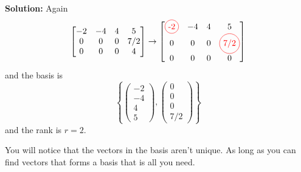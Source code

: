 \documentclass[reqno]{amsart}
\theoremstyle{definition}
\begin{document}
\begin{enumerate}
\textbf{Solution:  }
Again
%
\begin{equation*}
\begin{bmatrix}
-2 & -4 & 4 & 5\\
0 & 0 & 0 & 7/2\\
0 & 0 & 0 & 4
\end{bmatrix} \rightarrow \begin{bmatrix}
\circled{-2} & -4 & 4 & 5\\
0 & 0 & 0 & \circled{7/2}\\
0 & 0 & 0 & 0
\end{bmatrix}
\end{equation*}
%
and the basis is
%
\begin{equation*}
\left\lbrace \begin{pmatrix}
-2\\
-4\\
4\\
5
\end{pmatrix}, \begin{pmatrix}
0\\
0\\
0\\
7/2
\end{pmatrix}\right\rbrace
\end{equation*}
%
and the rank is $r=2$.

\end{enumerate}

You will notice that the vectors in the basis aren't unique.  As long as you can find vectors that
forms a basis that is all you need.
\end{document}
